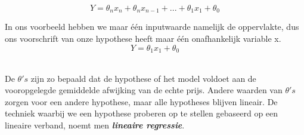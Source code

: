\[Y =  \theta_{n}x_{n} + \theta_{n}x_{n-1} + ... + \theta_{1}x_{1} + \theta_{0}\]
\newline

In ons voorbeeld hebben we maar \'e\'en inputwaarde namelijk de oppervlakte, dus ons voorschrift van onze hypothese heeft maar \'e\'en onafhankelijk variable x.
\newline
\[ Y = \theta_{1}x_{1} + \theta_{0}\] \\ 
\begin{center}
\end{center}
\newline


De $\theta's$ zijn zo bepaald dat de hypothese of het model voldoet aan de vooropgelegde gemiddelde afwijking van de echte prijs. Andere waarden van $\theta's$ zorgen voor een andere  hypothese, maar alle hypotheses blijven lineair. De techniek waarbij we een hypothese proberen op te stellen gebaseerd op een lineaire verband, noemt men \textbf{\textit{lineaire regressie}}. 

